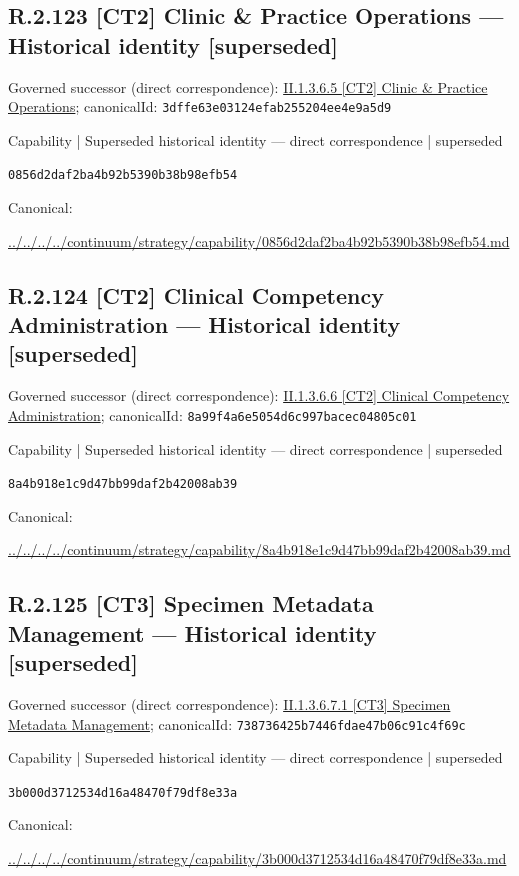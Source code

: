 \documentclass[10pt,a4paper]{article}
\begin{document}
\subsection*{R.2.123 [CT2] Clinic \& Practice Operations — Historical identity [superseded]}
Governed successor (direct correspondence): \hyperref[element-3dffe63e03124efab255204ee4e9a5d9]{II.1.3.6.5 [CT2] Clinic \& Practice Operations}; canonicalId: \texttt{3dffe63e03124efab255204ee4e9a5d9}\par
\label{element-0856d2daf2ba4b92b5390b38b98efb54}
{\small Capability | Superseded historical identity — direct correspondence | superseded}\par
\texttt{0856d2daf2ba4b92b5390b38b98efb54}\par
Canonical: \par
{\footnotesize\url{../../../../continuum/strategy/capability/0856d2daf2ba4b92b5390b38b98efb54.md}}\par
\subsection*{R.2.124 [CT2] Clinical Competency Administration — Historical identity [superseded]}
Governed successor (direct correspondence): \hyperref[element-8a99f4a6e5054d6c997bacec04805c01]{II.1.3.6.6 [CT2] Clinical Competency Administration}; canonicalId: \texttt{8a99f4a6e5054d6c997bacec04805c01}\par
\label{element-8a4b918e1c9d47bb99daf2b42008ab39}
{\small Capability | Superseded historical identity — direct correspondence | superseded}\par
\texttt{8a4b918e1c9d47bb99daf2b42008ab39}\par
Canonical: \par
{\footnotesize\url{../../../../continuum/strategy/capability/8a4b918e1c9d47bb99daf2b42008ab39.md}}\par
\subsection*{R.2.125 [CT3] Specimen Metadata Management — Historical identity [superseded]}
Governed successor (direct correspondence): \hyperref[element-738736425b7446fdae47b06c91c4f69c]{II.1.3.6.7.1 [CT3] Specimen Metadata Management}; canonicalId: \texttt{738736425b7446fdae47b06c91c4f69c}\par
\label{element-3b000d3712534d16a48470f79df8e33a}
{\small Capability | Superseded historical identity — direct correspondence | superseded}\par
\texttt{3b000d3712534d16a48470f79df8e33a}\par
Canonical: \par
{\footnotesize\url{../../../../continuum/strategy/capability/3b000d3712534d16a48470f79df8e33a.md}}\par
\end{document}
